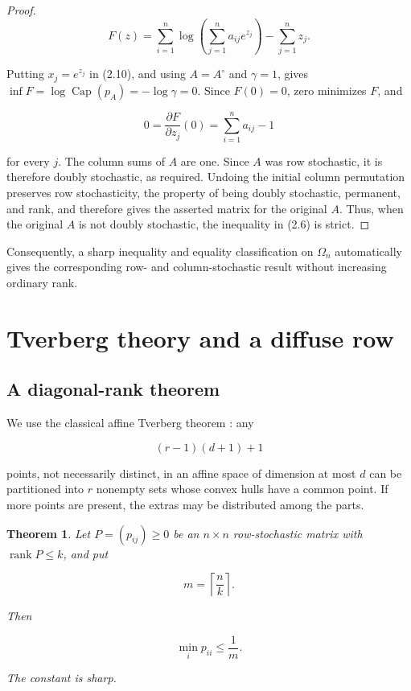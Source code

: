\documentclass[11pt]{article}
\newtheorem{theorem}{Theorem}[section]
\theoremstyle{remark}
\begin{document}
\begin{proof}
\[
 F(z)=\sum_{i=1}^n
 \log\!\left(\sum_{j=1}^n a_{ij}e^{z_j}\right)
 -\sum_{j=1}^n z_j.                                       \tag{2.14}
\]

Putting \(x_j=e^{z_j}\) in (2.10), and using \(A=A^\circ\) and \(\gamma=1\),
gives \(\inf F=\log\operatorname{Cap}(p_A)=-\log\gamma=0\). Since
\(F(0)=0\), zero minimizes \(F\), and

\nopagebreak[4]
\[
 0=\frac{\partial F}{\partial z_j}(0)
 =\sum_{i=1}^n a_{ij}-1                                   \tag{2.15}
\]

for every \(j\). The column sums of \(A\) are one. Since \(A\) was row
stochastic, it is therefore doubly stochastic, as required. Undoing the
initial column permutation preserves row stochasticity, the property of
being doubly stochastic, permanent, and rank, and therefore gives the
asserted matrix for the original \(A\). Thus, when the original \(A\) is not
doubly stochastic, the inequality in (2.6) is strict.
\end{proof}

Consequently, a sharp inequality and equality classification on
\(\Omega_n\) automatically gives the corresponding row- and
column-stochastic result without increasing ordinary rank.

\section{Tverberg theory and a diffuse row}

\subsection{A diagonal-rank theorem}

We use the classical affine Tverberg theorem \cite{tverberg1966}: any

\[
 (r-1)(d+1)+1                                               \tag{3.1}
\]

points, not necessarily distinct, in an affine space of dimension at most
\(d\) can be partitioned into \(r\) nonempty sets whose convex hulls have a
common point. If more points are present, the extras may be distributed among
the parts.

\begin{theorem}
Let \(P=(p_{ij})\geq0\)
be an \(n\times n\) row-stochastic matrix with
\(\operatorname{rank}P\leq k\), and put

\[
 m=\left\lceil\frac nk\right\rceil.
\]

Then

\[
 \boxed{\min_i p_{ii}\leq\frac1m.}                         \tag{3.2}
\]

The constant is sharp.
\end{theorem}
\end{document}
